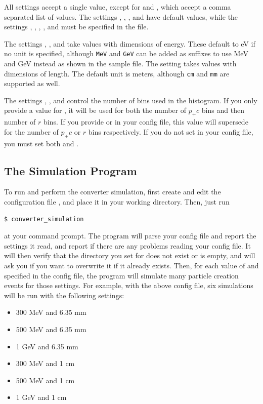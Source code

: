 \documentclass[12pt]{article}
\begin{document}
All settings accept a single value, except for \pcin and \targett, which accept a comma separated
list of values.  The settings \outpcmin, \outdir, \numbins, and \fitxpt have default values, while
the settings \targetm, \targett, \pcin, \outpcmax, and \dxydsmax must be specified in the file.

The settings \pcin, \outpcmin, and \outpcmax take values with dimensions of energy.  These default
to eV if no unit is specified, although \texttt{MeV} and \texttt{GeV} can be added as suffixes to
use MeV and GeV instead as shown in the sample file.  The \targett setting takes values with
dimensions of length.  The default unit is meters, although \texttt{cm} and \texttt{mm} are
supported as well.

The settings \numbins, \numpcbins, and \numrbins control the number of bins used in the histogram.
If you only provide a value for \numbins, it will be used for both the number of $p_+c$ bins and
then number of $r$ bins.  If you provide \numpcbins or \numrbins in your config file, this value
will supersede \numbins for the number of $p_+ c$ or $r$ bins respectively.  If you do not set
\numbins in your config file, you must set both \numpcbins and \numrbins.

\subsection{The Simulation Program}

To run \exes  and perform the converter simulation, first create and edit the configuration file \configfile, and place it in your working directory.
Then, just run
\begin{verbatim}
$ converter_simulation
\end{verbatim}
at your command prompt.  The program will parse your config file and report the settings it read,
and report if there are any problems reading your config file.  It will then verify that the
directory you set for \outdir  does not exist or is empty, and will ask you if you want to
overwrite it if it already exists.  Then, for each value of \pcin  and \targett  specified in
the config file, the program will simulate many particle creation events for those settings.  For example,
with the above config file, six simulations will be run with the following settings:
\begin{itemize}
\item
300 MeV \pcin  and 6.35 mm \targett

\item
500 MeV \pcin  and 6.35 mm \targett

\item
1 GeV \pcin  and 6.35 mm \targett

\item
300 MeV \pcin  and 1 cm \targett

\item
500 MeV \pcin  and 1 cm \targett

\item
1 GeV \pcin  and 1 cm \targett
\end{itemize}
\end{document}
